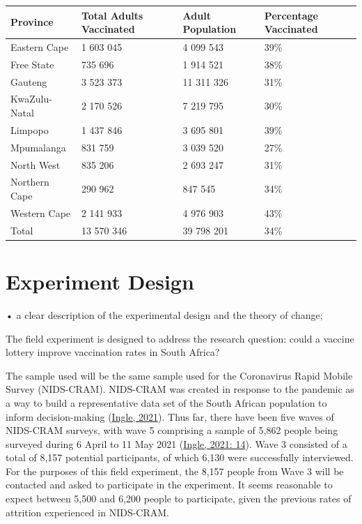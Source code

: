\documentclass[11pt,preprint, authoryear]{elsarticle}
\let\origtable\table
\let\endorigtable\endtable
\renewenvironment{table}[1][2] {
    \expandafter\origtable\expandafter[H]
} {
    \endorigtable
}
\numberwithin{equation}{section}
\numberwithin{figure}{section}
\numberwithin{table}{section}
\begin{document}
\begin{table}[H]
\centering
\begin{tabular}{llll}
  \toprule
Province & Total Adults Vaccinated & Adult Population & Percentage Vaccinated \\ 
  \midrule
Eastern Cape & 1 603 045 & 4 099 543 & 39\% \\ 
  Free State & 735 696 & 1 914 521 & 38\% \\ 
  Gauteng & 3 523 373 & 11 311 326 & 31\% \\ 
  KwaZulu-Natal & 2 170 526 & 7 219 795 & 30\% \\ 
  Limpopo & 1 437 846 & 3 695 801 & 39\% \\ 
  Mpumalanga & 831 759 & 3 039 520 & 27\% \\ 
  North West & 835 206 & 2 693 247 & 31\% \\ 
  Northern Cape & 290 962 & 847 545 & 34\% \\ 
  Western Cape & 2 141 933 & 4 976 903 & 43\% \\ 
  Total & 13 570 346 & 39 798 201 & 34\% \\ 
   \bottomrule
\end{tabular}
\caption{Vaccination Statistics \label{tab1}} 
\end{table}

\hypertarget{experiment-design}{%
\section{\texorpdfstring{Experiment Design
\label{design}}{Experiment Design }}\label{experiment-design}}

• a clear description of the experimental design and the theory of
change;

The field experiment is designed to address the research question: could
a vaccine lottery improve vaccination rates in South Africa?

The sample used will be the same sample used for the Coronavirus Rapid
Mobile Survey (NIDS-CRAM). NIDS-CRAM was created in response to the
pandemic as a way to build a representative data set of the South
African population to inform decision-making
(\protect\hyperlink{ref-nids}{Ingle, 2021}). Thus far, there have been
five waves of NIDS-CRAM surveys, with wave 5 comprising a sample of
5,862 people being surveyed during 6 April to 11 May 2021
(\protect\hyperlink{ref-nids}{Ingle, 2021: 14}). Wave 3 consisted of a
total of 8,157 potential participants, of which 6,130 were successfully
interviewed. For the purposes of this field experiment, the 8,157 people
from Wave 3 will be contacted and asked to participate in the
experiment. It seems reasonable to expect between 5,500 and 6,200 people
to participate, given the previous rates of attrition experienced in
NIDS-CRAM.
\end{document}
